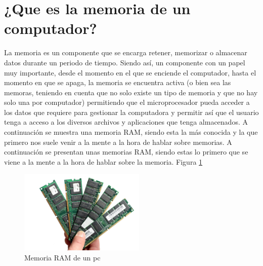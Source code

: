 \documentclass{article}
\begin{document}
\section{¿Que es la memoria de un computador?} \label{contenido}
La memoria es un componente que se encarga retener, memorizar o almacenar datos durante un periodo de tiempo.\cite{definicion}
Siendo así, un componente con un papel muy importante, desde el momento en el que se enciende el computador, hasta el momento en que se apaga, la memoria se encuentra activa (o bien sea las memoras, teniendo en cuenta que no solo existe un tipo de memoria y que no hay solo una por computador) permitiendo que el microprocesador pueda acceder a los datos que requiere para gestionar la computadora y permitir así que el usuario tenga a acceso a los diversos archivos y aplicaciones que tenga almacenados. A continuación se muestra una memoria RAM, siendo esta la más conocida y la que primero nos suele venir a la mente a la hora de hablar sobre memorias. A continuación se presentan unas memorias RAM, siendo estas lo primero que se viene a la mente a la hora de hablar sobre la memoria. Figura \ref{fig:memoriapc}

\begin{figure}[h]
\includegraphics[width=6cm]{Memoria.jpg}
\centering
\caption{Memoria RAM de un pc}
\label{fig:memoriapc}
\end{figure}
\end{document}
